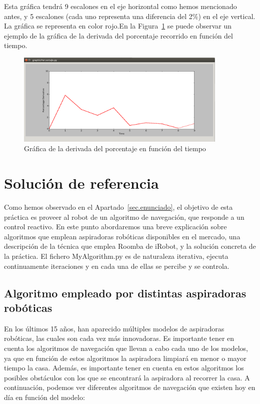 Esta gráfica tendrá 9 escalones en el eje horizontal como hemos mencionado antes, y 5 escalones (cada uno representa una diferencia del 2\%) en el eje vertical. La gráfica se representa en color rojo.En la Figura~\ref{fig.grafica_percentaje2} se puede observar un ejemplo de la gráfica de la derivada del porcentaje recorrido en función del tiempo.\\

\begin{figure}[H]
  \begin{center}
    \includegraphics[width=0.9\textwidth]{figures/Vacuum/Grafica_percentaje2.png}
		\caption{Gráfica de la derivada del porcentaje en función del tiempo}
		\label{fig.grafica_percentaje2}
		\end{center}
\end{figure}

\section{Solución de referencia}
Como hemos observado en el Apartado~\ref{sec.enunciado}, el objetivo de esta práctica es proveer al robot de un algoritmo de navegación, que responde a un control reactivo. En este punto abordaremos una breve explicación sobre algoritmos que emplean aspiradoras robóticas disponibles en el mercado, una descripción de la técnica que emplea Roomba de iRobot, y la solución concreta de la práctica. El fichero MyAlgorithm.py es de naturaleza iterativa, ejecuta continuamente iteraciones y en cada una de ellas se percibe y se controla.


\subsection{Algoritmo empleado por distintas aspiradoras robóticas}
En los últimos 15 años, han aparecido múltiples modelos de aspiradoras robóticas, las cuales son cada vez más innovadoras. Es importante tener en cuenta los algoritmos de navegación que llevan a cabo cada uno de los modelos, ya que en función de estos algoritmos la aspiradora limpiará en menor o mayor tiempo la casa. Además, es importante tener en cuenta en estos algoritmos los posibles obstáculos con los que se encontrará la aspiradora al recorrer la casa. A continuación, podemos ver diferentes algoritmos de navegación que existen hoy en día en función del modelo:

